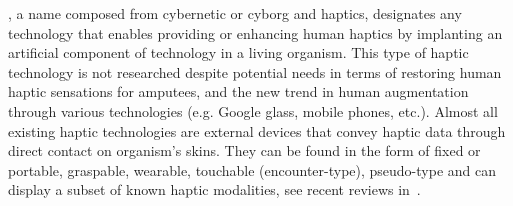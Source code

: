 \documentclass[10pt,journal,compsoc]{IEEEtran}
\begin{document}
%
\IEEEpeerreviewmaketitle







% 
% 
% 
% 
, a name composed from cybernetic or cyborg and haptics, designates any technology that enables providing or enhancing human haptics by implanting an artificial component of technology in a living organism. This type of haptic technology is not researched despite potential needs in terms of restoring human haptic sensations for amputees, and the new trend in human augmentation through various technologies (e.g. Google glass, mobile phones, etc.). Almost all existing haptic technologies are external devices that convey haptic data through direct contact on organism's skins. They can be found in the form of fixed or portable, graspable, wearable, touchable (encounter-type), pseudo-type and can display a subset of known haptic modalities, see recent reviews in~\cite{culbertson2018arcras}.  
\end{document}
